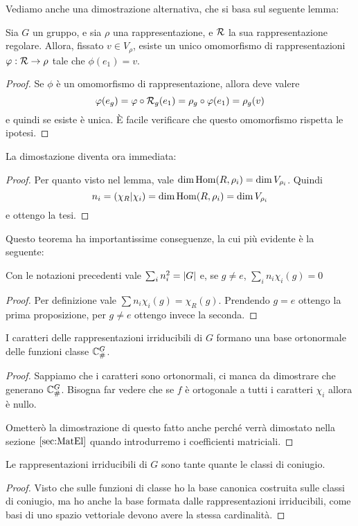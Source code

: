Vediamo anche una dimostrazione alternativa, che si basa sul seguente lemma:
\begin{mylemma}
  Sia $G$ un gruppo, e sia $\rho$ una rappresentazione, e $\mathcal R$ la sua rappresentazione regolare. Allora, fissato $v\in V_\rho$, esiste un unico omomorfismo di rappresentazioni $\varphi: \mathcal R \rightarrow \rho$ tale che $\phi(e_1)=v$.
\end{mylemma}
\begin{proof}
  Se $\phi$ è un omomorfismo di rappresentazione, allora deve valere 
  \[
  \varphi(e_g)=\varphi \circ \mathcal R_g (e_1) = \rho_g \circ \varphi (e_1) = \rho_g(v)
  \]
  e quindi se esiste è unica. \`E facile verificare che questo omomorfismo rispetta le ipotesi.
\end{proof}

La dimostazione diventa ora immediata:
\begin{proof}
  Per quanto visto nel lemma, vale $\dim \operatorname{Hom}(R,\rho_i) = \dim V_{\rho_i}$. Quindi
  \[
		n_i = \left(\chi_R | \chi_i\right)= \dim \operatorname{Hom}(R,\rho_i) = \dim V_{\rho_i}
  \]
  e ottengo la tesi.
\end{proof}

Questo teorema ha importantissime conseguenze, la cui più evidente è la seguente:
\begin{myprop}
  Con le notazioni precedenti vale $\sum_i n_i^2 = \left|G\right|$ e, se $g\ne e$, $\sum_i n_i \chi_i(g)=0$
\end{myprop}
\begin{proof}
  Per definizione vale $\sum n_i \chi_i(g) = \chi_R(g)$. Prendendo $g=e$ ottengo la prima proposizione, per $g\ne e$ ottengo invece la seconda.
\end{proof}

\begin{mytheorem}
  I caratteri delle rappresentazioni irriducibili di $G$ formano una base ortonormale delle funzioni classe $\mathbb C^{G}_\#$.
\end{mytheorem}

\begin{proof}
  Sappiamo che i caratteri sono ortonormali, ci manca da dimostrare che generano $\mathbb C^{G}_\#$. Bisogna far vedere che se $f$ è ortogonale a tutti i caratteri $\chi_i$ allora è nullo.
  
  Ometterò la dimostrazione di questo fatto anche perché verrà dimostato nella sezione $\ref{sec:MatEl}$ quando introdurremo i coefficienti matriciali.
\end{proof}


\begin{mytheorem}
  Le rappresentazioni irriducibili di $G$ sono tante quante le classi di coniugio.
\end{mytheorem}

\begin{proof}
  Visto che sulle funzioni di classe ho la base canonica costruita sulle classi di coniugio, ma ho anche la base formata dalle rappresentazioni irriducibili, come basi di uno spazio vettoriale devono avere la stessa cardinalità.
\end{proof}






